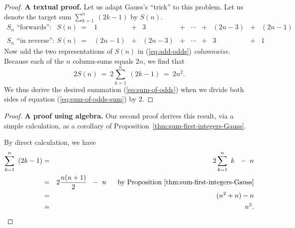 \begin{proof}
{\bf A textual proof.}
%
Let us adapt Gauss's ``trick'' to this problem.  Let us denote the
target sum $\sum_{k=1}^n \ (2k-1)$ by $S(n)$. 
\begin{equation}
\label{eq:add-odds}
\begin{array}{llccccccccc}
\mbox{$S_n$ ``forwards'':} &
S(n) \ = 
& 1 & + & 3 & + & \cdots & + & (2n-3) & + & (2n-1) \\
 & & & & & & & & & &  \\
\mbox{$S_n$ ``in reverse'':} &
S(n) \ =
& (2n-1) & + & (2n-3) & + & \cdots & + & 3 & + & 1
\end{array}
\end{equation}
Now add the two representations of $S(n)$ in (\ref{eq:add-odds}) {\em
  columnwise}.  Because each of the $n$ column-sums equals $2n$, we
find that
\begin{equation}
\label{eq:sum-of-odds-sum}
2 S(n) \ = \ 2 \sum_{k=1}^n \ (2k-1) \ = \ 2n^2.
\end{equation}
We thus derive the desired summation (\ref{eq:sum-of-odds}) when we
divide both sides of equation (\ref{eq:sum-of-odds-sum}) by $2$.
\end{proof}

\medskip

\begin{proof}
{\bf A proof using algebra.}
%
Our second proof derives this result, via a simple calculation, as a
corollary of Proposition~\ref{thm:sum-first-integers-Gauss}.

By direct calculation, we have
\begin{eqnarray*}
\sum_{k=1}^n \ \left( 2k-1 \right)
   & = & 2 \sum_{k=1}^n \ k \ \ - \ n \\
   & = & 2 \frac{n (n+1)}{2} \ \ - \ n \ \ \ \ \mbox{ by
  Proposition~\ref{thm:sum-first-integers-Gauss}} \\
   & = & (n^2 + n) - n \\
   & = & n^2.
\end{eqnarray*}
\end{proof}

\medskip

